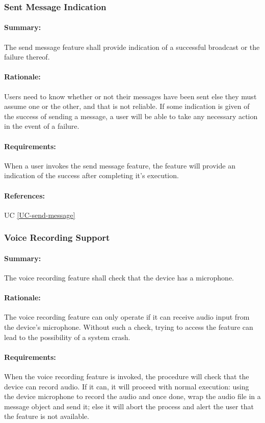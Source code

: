 \documentclass[11pt]{article}
\begin{document}
\subsubsection{Sent Message Indication} \label{FR-send-message-indicator}
\paragraph{Summary:} The send message feature shall provide indication of a successful broadcast or the failure thereof.
\paragraph{Rationale:} Users need to know whether or not their messages have been sent else they must assume one or the other, and that is not reliable. If some indication is given of the success of sending a message, a user will be able to take any necessary action in the event of a failure.
\paragraph{Requirements:} When a user invokes the send message feature, the feature will provide an indication of the success after completing it's execution.
\paragraph{References:} UC \ref{UC-send-message}

\subsubsection{Voice Recording Support} \label{FR-voice-record-support}
\paragraph{Summary:} The voice recording feature shall check that the device has a microphone.
\paragraph{Rationale:} The voice recording feature can only operate if it can receive audio input from the device's microphone. Without such a check, trying to access the feature can lead to the possibility of a system crash.
\paragraph{Requirements:} When the voice recording feature is invoked, the procedure will check that the device can record audio. If it can, it will proceed with normal execution: using the device microphone to record the audio and once done, wrap the audio file in a message object and send it; else it will abort the process and alert the user that the feature is not available.
\end{document}

